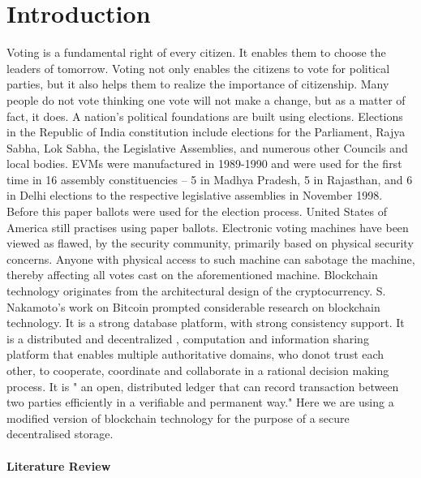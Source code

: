\documentclass{report}
\begin{document}
\chapter{Introduction}
Voting is a fundamental right of every citizen. It enables them to choose the leaders of tomorrow. Voting not only enables the citizens to vote for political parties, but it also helps them to realize the importance of citizenship. Many people do not vote thinking one vote will not make a change, but as a matter of fact, it does. A nation’s political foundations are built using elections.\cite{blais1999people}   Elections in the Republic of India constitution include elections for the Parliament, Rajya Sabha, Lok Sabha, the Legislative Assemblies, and numerous other Councils and local bodies. EVMs were manufactured in 1989-1990 and were used for the first time in 16 assembly constituencies -- 5 in Madhya Pradesh, 5 in Rajasthan, and 6 in Delhi elections to the respective legislative assemblies in November 1998. Before this paper ballots were used for the election process. United States of America still practises using paper ballots. Electronic voting machines have been viewed as flawed, by the security community, primarily based on physical security concerns. Anyone with physical access to such machine can sabotage the machine, thereby affecting all votes cast on the aforementioned machine.\cite{hjalmarsson2018blockchain} Blockchain technology originates from the  architectural design of the cryptocurrency. S. Nakamoto's work on Bitcoin \cite{nakamoto2008bitcoin} prompted considerable research on blockchain technology.  It is a strong database platform, with strong consistency support. It is a distributed and decentralized , computation and information sharing platform that enables multiple authoritative domains, who donot trust each other, to cooperate, coordinate and collaborate in a rational decision making process. It is " an open, distributed ledger that can record transaction between two parties efficiently in a verifiable and permanent way.\cite{iansiti2017truth}" Here we are using a modified version of blockchain technology for the purpose of a secure decentralised storage. \\
\\
\textbf{Literature Review}
\end{document}
